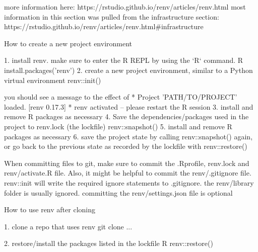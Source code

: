 more information here: https://rstudio.github.io/renv/articles/renv.html
most information in this section was pulled from the infrastructure section: https://rstudio.github.io/renv/articles/renv.html#infrastructure

How to create a new project environment

1. install renv. make sure to enter the R REPL by using the `R` command.
    R
    install.packages('renv')
2. create a new project environment, similar to a Python virtual environment
    renv::init()
	
	you should see a message to the effect of
	* Project 'PATH/TO/PROJECT' loaded. [renv 0.17.3]
	* renv activated -- please restart the R session
3. install and remove R packages as necessary
4. Save the dependencies/packages used in the project to renv.lock (the lockfile)
    renv::snapshot()
5. install and remove R packages as necessary
6. save the project state by calling renv::snapshot() again, or go back to the previous state as recorded
   by the lockfile with renv::restore()

When committing files to git, make sure to commit the .Rprofile, renv.lock and renv/activate.R file.
Also, it might be helpful to commit the renv/.gitignore file. renv::init will write the required ignore statements to .gitignore. the renv/library folder is usually ignored.
committing the renv/settings.json file is optional

How to use renv after cloning

1. clone a repo that uses renv
	git clone ...

2. restore/install the packages listed in the lockfile
	R
	renv::restore()
